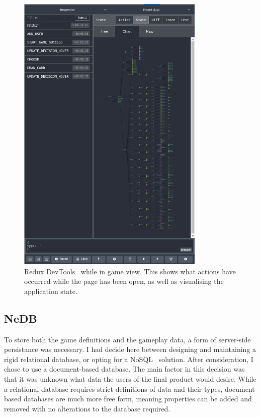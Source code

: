 \begin{figure}[!h]
	\centering
	\includegraphics[width=0.8\textwidth]{./images/impl/redux_view.png}
	\caption{Redux DevTools~\cite{ReduxDev} while in game view. This shows what actions have occurred while the page has been open, as well as visualising the application state.}
	\label{fig:redux_view}
\end{figure}

\subsection{NeDB}
To store both the game definitions and the gameplay data, a form of server-side persistance was necessary. I had decide here between designing and maintaining a rigid relational database, or opting for a NoSQL~\cite{NoSQL} solution. After consideration, I chose to use a document-based database. The main factor in this decision was that it was unknown what data the users of the final product would desire. While a relational database requires strict definitions of data and their types, document-based databases are much more free form, meaning properties can be added and removed with no alterations to the database required.


